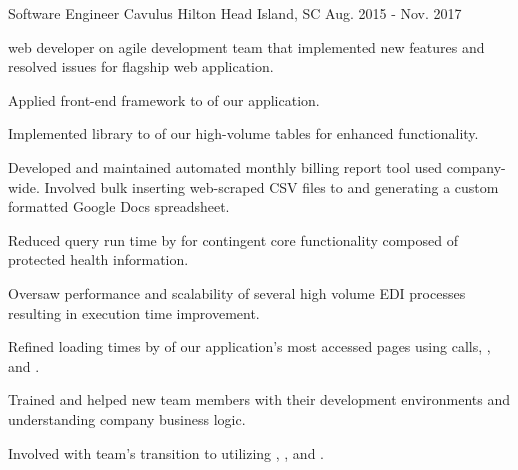 

\begin{cventries}

  \cventry
    {Software Engineer} %
    {Cavulus} %
    {Hilton Head Island, SC} %
    {Aug. 2015 - Nov. 2017} %
    {
      \begin{cvitems} %
        \item { web developer on agile development team that implemented new features and resolved issues for flagship web application.}
        \item {Applied front-end framework  to  of our application.}
        \item {Implemented  library  to  of our high-volume tables for enhanced functionality.}
        \item {Developed and maintained automated monthly billing report tool used company-wide. Involved bulk inserting web-scraped CSV files to  and generating a custom formatted Google Docs spreadsheet.}
        \item {Reduced query run time by  for  contingent core functionality composed of protected health information.}
        \item {Oversaw performance and scalability of several high volume EDI processes resulting in  execution time improvement.}
        \item {Refined loading times by  of our application’s most accessed pages using  calls, , and .}
        \item {Trained and helped new team members with their development environments and understanding company business logic.}
        \item {Involved with team's transition to utilizing , , and .}
      \end{cvitems}
    }


\end{cventries}
